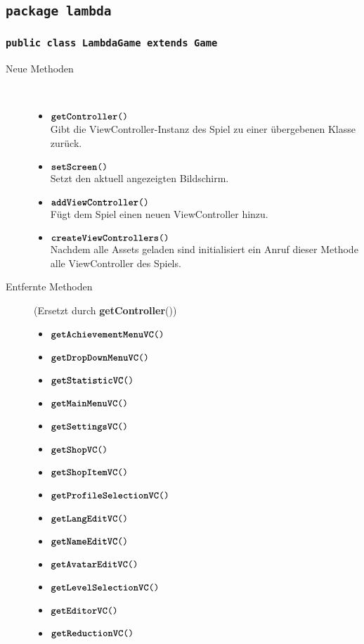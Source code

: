 \subsection{\texttt{package lambda}}

\subsubsection{\normalfont \texttt{public class \textbf{LambdaGame} extends Game}}

\begin{description}
\item[Neue Methoden] \hfill \\
	\vspace{-.8cm}
	\begin{itemize}
		\item $\texttt{\textbf{getController}()}$ \\ Gibt die ViewController-Instanz des Spiel zu einer übergebenen Klasse zurück.
		\item $\texttt{\textbf{setScreen}()}$ \\ Setzt den aktuell angezeigten Bildschirm.
		\item $\texttt{\textbf{addViewController}()}$ \\ Fügt dem Spiel einen neuen ViewController hinzu.
		\item $\texttt{\textbf{createViewControllers}()}$ \\ Nachdem alle Assets geladen sind initialisiert ein Anruf dieser Methode alle ViewController des Spiels.
	\end{itemize}
	
\item[Entfernte Methoden] (Ersetzt durch \textbf{getController}()) \hfill \\
	\vspace{-.8cm}
	\begin{itemize}
		\item $\texttt{\textbf{getAchievementMenuVC}()}$
		\item $\texttt{\textbf{getDropDownMenuVC}()}$
		\item $\texttt{\textbf{getStatisticVC}()}$ 			
		\item $\texttt{\textbf{getMainMenuVC}()}$			
		\item $\texttt{\textbf{getSettingsVC}()}$			
		\item $\texttt{\textbf{getShopVC}()}$			
		\item $\texttt{\textbf{getShopItemVC}()}$			
		\item $\texttt{\textbf{getProfileSelectionVC}()}$		
		\item $\texttt{\textbf{getLangEditVC}()}$		
		\item $\texttt{\textbf{getNameEditVC}()}$		
		\item $\texttt{\textbf{getAvatarEditVC}()}$		
		\item $\texttt{\textbf{getLevelSelectionVC}()}$		
		\item $\texttt{\textbf{getEditorVC}()}$		
		\item $\texttt{\textbf{getReductionVC}()}$
	\end{itemize}
\end{description}

